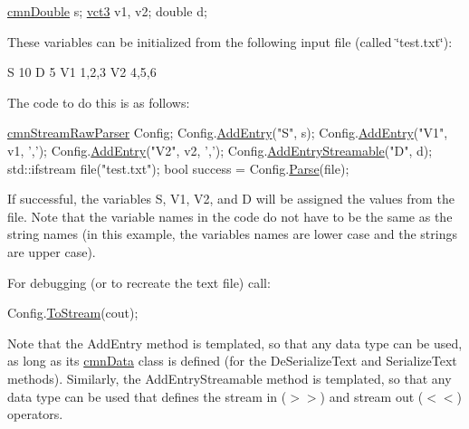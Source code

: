 \begin{DoxyCode}
\hyperlink{classcmn_generic_object_proxy}{cmnDouble} s;
\hyperlink{classvct_fixed_size_vector}{vct3} v1, v2;
\textcolor{keywordtype}{double} d;
\end{DoxyCode}


These variables can be initialized from the following input file (called \char`\"{}test.\-txt\char`\"{})\-:


\begin{DoxyCode}
S 10
D 5
V1 1,2,3
V2 4,5,6
\end{DoxyCode}


The code to do this is as follows\-:


\begin{DoxyCode}
\hyperlink{classcmn_stream_raw_parser}{cmnStreamRawParser} Config;
Config.\hyperlink{classcmn_stream_raw_parser_a85682f38234f9f9c9c452240511f52ba}{AddEntry}(\textcolor{stringliteral}{"S"}, s);
Config.\hyperlink{classcmn_stream_raw_parser_a85682f38234f9f9c9c452240511f52ba}{AddEntry}(\textcolor{stringliteral}{"V1"}, v1, \textcolor{charliteral}{','});
Config.\hyperlink{classcmn_stream_raw_parser_a85682f38234f9f9c9c452240511f52ba}{AddEntry}(\textcolor{stringliteral}{"V2"}, v2, \textcolor{charliteral}{','});
Config.\hyperlink{classcmn_stream_raw_parser_a6fd698505c5456edf6659d2eb3c7525c}{AddEntryStreamable}(\textcolor{stringliteral}{"D"}, d);
std::ifstream file(\textcolor{stringliteral}{"test.txt"});
\textcolor{keywordtype}{bool} success = Config.\hyperlink{classcmn_stream_raw_parser_aa414a151c05b00e73c20d1ed13c94d7a}{Parse}(file);
\end{DoxyCode}


If successful, the variables S, V1, V2, and D will be assigned the values from the file. Note that the variable names in the code do not have to be the same as the string names (in this example, the variables names are lower case and the strings are upper case).

For debugging (or to recreate the text file) call\-:


\begin{DoxyCode}
Config.\hyperlink{classcmn_stream_raw_parser_a34cc22ae5fb87be3563dbce530bc6e1d}{ToStream}(cout);
\end{DoxyCode}


Note that the Add\-Entry method is templated, so that any data type can be used, as long as its \hyperlink{classcmn_data}{cmn\-Data} class is defined (for the De\-Serialize\-Text and Serialize\-Text methods). Similarly, the Add\-Entry\-Streamable method is templated, so that any data type can be used that defines the stream in ($>$$>$) and stream out ($<$$<$) operators.

